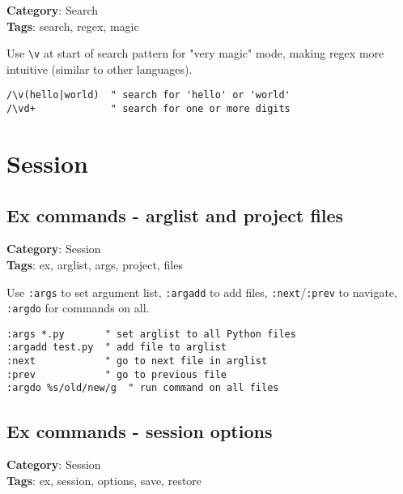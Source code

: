 {{{{{{{{{{{{{\textbf{Category}: Search\\ \textbf{Tags}: search, regex, magic
\vspace{0.5cm}

Use {\footnotesize \Verb§\v§} at start of search pattern for "very magic" mode, making regex more intuitive (similar to other languages).

\begin{Exa*}{}
\begin{Verbatim}[fontsize=\footnotesize, breaklines, breakanywhere]
/\v(hello|world)  " search for 'hello' or 'world'
/\vd+             " search for one or more digits
\end{Verbatim}
\end{Exa*}

\chapter{Session}
\section{Ex commands - arglist and project files}

\textbf{Category}: Session\\ \textbf{Tags}: ex, arglist, args, project, files
\vspace{0.5cm}

Use {\footnotesize \Verb§:args§} to set argument list, {\footnotesize \Verb§:argadd§} to add files, {\footnotesize \Verb§:next§}/{\footnotesize \Verb§:prev§} to navigate, {\footnotesize \Verb§:argdo§} for commands on all.

\begin{Exa*}{}
\begin{Verbatim}[fontsize=\footnotesize, breaklines, breakanywhere]
:args *.py       " set arglist to all Python files
:argadd test.py  " add file to arglist
:next            " go to next file in arglist
:prev            " go to previous file
:argdo %s/old/new/g  " run command on all files
\end{Verbatim}
\end{Exa*}

\section{Ex commands - session options}

\textbf{Category}: Session\\ \textbf{Tags}: ex, session, options, save, restore
\vspace{0.5cm}

}}}}}}}}}}}}}
